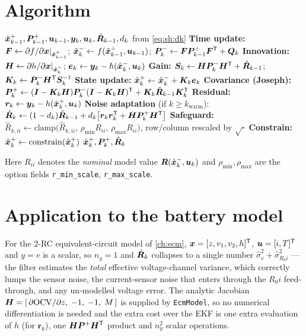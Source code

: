 \section{Algorithm}
\begin{algorithm}[H]
\caption{SageHusa-AKF --- one sampling period}
\begin{algorithmic}[1]
\Require $\hat{\bm{x}}^{+}_{k-1},\bm{P}^{+}_{k-1},\bm{u}_{k-1},\bm{y}_k,\bm{u}_k,\hat{\bm{R}}_{k-1},d_k$ from \eqref{eq:sh:dk}
\State \textbf{Time update:} $\bm{F}\gets\partial f/\partial\bm{x}|_{\hat{\bm{x}}^{+}_{k-1}}$;\quad
       $\hat{\bm{x}}^{-}_k\gets f(\hat{\bm{x}}^{+}_{k-1},\bm{u}_{k-1})$;\quad
       $\bm{P}^{-}_k\gets \bm{F}\bm{P}^{+}_{k-1}\bm{F}^{\mathsf{T}}+\bm{Q}_k$
\State \textbf{Innovation:} $\bm{H}\gets\partial h/\partial\bm{x}|_{\hat{\bm{x}}^{-}_k}$;\quad
       $\bm{e}_k\gets\bm{y}_k-h(\hat{\bm{x}}^{-}_k,\bm{u}_k)$
\State \textbf{Gain:} $\bm{S}_k\gets \bm{H}\bm{P}^{-}_k\bm{H}^{\mathsf{T}}+\hat{\bm{R}}_{k-1}$;\quad
       $\bm{K}_k\gets\bm{P}^{-}_k\bm{H}^{\mathsf{T}}\bm{S}_k^{-1}$ 
\State \textbf{State update:} $\hat{\bm{x}}^{+}_k\gets\hat{\bm{x}}^{-}_k+\bm{K}_k\bm{e}_k$
\State \textbf{Covariance (Joseph):} $\bm{P}^{+}_k\gets(\bm{I}-\bm{K}_k\bm{H})\bm{P}^{-}_k(\bm{I}-\bm{K}_k\bm{H})^{\mathsf{T}}+\bm{K}_k\hat{\bm{R}}_{k-1}\bm{K}_k^{\mathsf{T}}$
\State \textbf{Residual:} $\bm{r}_k\gets\bm{y}_k-h(\hat{\bm{x}}^{+}_k,\bm{u}_k)$
\State \textbf{Noise adaptation} (if $k\ge k_{\text{warm}}$):
       $\hat{\bm{R}}_k\gets(1-d_k)\hat{\bm{R}}_{k-1}+d_k\big[\bm{r}_k\bm{r}_k^{\mathsf{T}}+\bm{H}\bm{P}^{+}_k\bm{H}^{\mathsf{T}}\big]$
\State \textbf{Safeguard:} $\hat{R}_{k,ii}\gets\mathrm{clamp}\big(\hat{R}_{k,ii},\,\rho_{\min}R_{ii},\,\rho_{\max}R_{ii}\big)$, row/column rescaled by $\sqrt{\cdot}$
\State \textbf{Constrain:} $\hat{\bm{x}}^{+}_k\gets\mathrm{constrain}(\hat{\bm{x}}^{+}_k)$
\Ensure $\hat{\bm{x}}^{+}_k,\bm{P}^{+}_k,\hat{\bm{R}}_k$
\end{algorithmic}
\end{algorithm}
Here $R_{ii}$ denotes the \emph{nominal} model value $\bm{R}(\hat{\bm{x}}^{-}_k,\bm{u}_k)$ and
$\rho_{\min},\rho_{\max}$ are the option fields \texttt{r\_min\_scale}, \texttt{r\_max\_scale}.

\section{Application to the battery model}
For the 2-RC equivalent-circuit model of \cref{ch:ecm}, $\bm{x}=[z,v_1,v_2,h]^{\mathsf{T}}$, $\bm{u}=[i,T]^{\mathsf{T}}$
and $y=v$ is a scalar, so $n_y=1$ and $\hat{\bm{R}}_k$ collapses to a single number
$\hat{\sigma}_v^2 + \hat{\sigma}_{R_0 i}^2$ --- the filter estimates the \emph{total} effective
voltage-channel variance, which correctly lumps the sensor noise, the current-sensor noise that
enters through the $R_0 i$ feed-through, and any un-modelled voltage error.  The analytic Jacobian
$\bm{H} = [\,\partial\mathrm{OCV}/\partial z,\;-1,\;-1,\;M\,]$ is supplied by \texttt{EcmModel}, so no
numerical differentiation is needed and the extra cost over the EKF is one extra evaluation of $h$
(for $\bm{r}_k$), one $\bm{H}\bm{P}^{+}\bm{H}^{\mathsf{T}}$ product and $n_y^2$ scalar operations.

